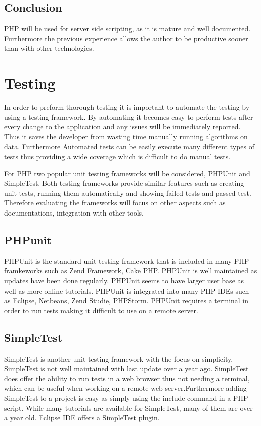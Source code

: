 \documentclass[a4paper,oneside,11pt]{report}
\begin{document}
\subsection{Conclusion}
PHP will be used for server side scripting, as it is mature and well documented. Furthermore the previous experience allows the author to be productive sooner than with other technologies.
\section{Testing}
In order to preform thorough testing it is important to automate the testing by using a testing framework. By automating it becomes easy to perform tests after every change to the application and any issues will be immediately reported. Thus it saves the developer from wasting time manually running algorithms on data. Furthermore Automated tests can be easily execute many different types of tests thus providing a wide coverage which is difficult to do manual tests.

For PHP two popular unit testing frameworks will be considered, PHPUnit and SimpleTest. Both testing frameworks provide similar features such as creating unit tests, running them automatically and showing failed tests and passed test. Therefore evaluating the frameworks will focus on other aspects such as documentations, integration with other tools.
\subsection{PHPunit}
PHPUnit is the standard unit testing framework that is included in many PHP framkeworks such as Zend Framework, Cake PHP. PHPUnit is well maintained as updates have been done regularly. PHPUnit seems to have larger user base as well as more online tutorials. PHPUnit is integrated into many PHP IDEs  such as Eclipse, Netbeans, Zend Studie, PHPStorm. PHPUnit requires a terminal in order to run tests making it difficult to use on a remote server.
\subsection{SimpleTest}
SimpleTest is another unit testing framework with the focus on simplicity. SimpleTest is not well maintained with last update over a year ago. SimpleTest does offer the ability to run tests in a web browser thus not needing a terminal, which can be useful when working on a remote web server.Furthermore adding SimpleTest to a project is easy as simply using the include command in a PHP script. While many tutorials are available for SimpleTest, many of them are over a year old. Eclipse IDE offers a SimpleTest plugin.
\end{document}
